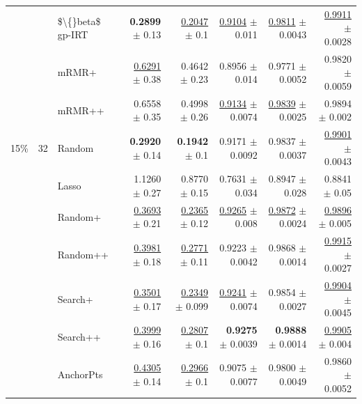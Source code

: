 \begin{longtable}{llp{}rrrrr}
 &  & \$\textbackslash\{\}beta\$ gp-IRT & \textbf{0.2899} {\scriptsize $\pm$ 0.13} & \underline{0.2047} {\scriptsize $\pm$ 0.1} & \underline{0.9104} {\scriptsize $\pm$ 0.011} & \underline{0.9811} {\scriptsize $\pm$ 0.0043} & \underline{0.9911} {\scriptsize $\pm$ 0.0028} \\
 &  & mRMR+ & \underline{0.6291} {\scriptsize $\pm$ 0.38} & 0.4642 {\scriptsize $\pm$ 0.23} & 0.8956 {\scriptsize $\pm$ 0.014} & 0.9771 {\scriptsize $\pm$ 0.0052} & 0.9820 {\scriptsize $\pm$ 0.0059} \\
 &  & mRMR++ & 0.6558 {\scriptsize $\pm$ 0.35} & 0.4998 {\scriptsize $\pm$ 0.26} & \underline{0.9134} {\scriptsize $\pm$ 0.0074} & \underline{0.9839} {\scriptsize $\pm$ 0.0025} & 0.9894 {\scriptsize $\pm$ 0.002} \\
\midrule
15\% & 32 & Random & \textbf{0.2920} {\scriptsize $\pm$ 0.14} & \textbf{0.1942} {\scriptsize $\pm$ 0.1} & 0.9171 {\scriptsize $\pm$ 0.0092} & 0.9837 {\scriptsize $\pm$ 0.0037} & \underline{0.9901} {\scriptsize $\pm$ 0.0043} \\
 &  & Lasso & 1.1260 {\scriptsize $\pm$ 0.27} & 0.8770 {\scriptsize $\pm$ 0.15} & 0.7631 {\scriptsize $\pm$ 0.034} & 0.8947 {\scriptsize $\pm$ 0.028} & 0.8841 {\scriptsize $\pm$ 0.05} \\
 &  & Random+ & \underline{0.3693} {\scriptsize $\pm$ 0.21} & \underline{0.2365} {\scriptsize $\pm$ 0.12} & \underline{0.9265} {\scriptsize $\pm$ 0.008} & \underline{0.9872} {\scriptsize $\pm$ 0.0024} & \underline{0.9896} {\scriptsize $\pm$ 0.005} \\
 &  & Random++ & \underline{0.3981} {\scriptsize $\pm$ 0.18} & \underline{0.2771} {\scriptsize $\pm$ 0.11} & 0.9223 {\scriptsize $\pm$ 0.0042} & 0.9868 {\scriptsize $\pm$ 0.0014} & \underline{0.9915} {\scriptsize $\pm$ 0.0027} \\
 &  & Search+ & \underline{0.3501} {\scriptsize $\pm$ 0.17} & \underline{0.2349} {\scriptsize $\pm$ 0.099} & \underline{0.9241} {\scriptsize $\pm$ 0.0074} & 0.9854 {\scriptsize $\pm$ 0.0027} & \underline{0.9904} {\scriptsize $\pm$ 0.0045} \\
 &  & Search++ & \underline{0.3999} {\scriptsize $\pm$ 0.16} & \underline{0.2807} {\scriptsize $\pm$ 0.1} & \textbf{0.9275} {\scriptsize $\pm$ 0.0039} & \textbf{0.9888} {\scriptsize $\pm$ 0.0014} & \underline{0.9905} {\scriptsize $\pm$ 0.004} \\
 &  & AnchorPts & \underline{0.4305} {\scriptsize $\pm$ 0.14} & \underline{0.2966} {\scriptsize $\pm$ 0.1} & 0.9075 {\scriptsize $\pm$ 0.0077} & 0.9800 {\scriptsize $\pm$ 0.0049} & 0.9860 {\scriptsize $\pm$ 0.0052} \\

\end{longtable}
